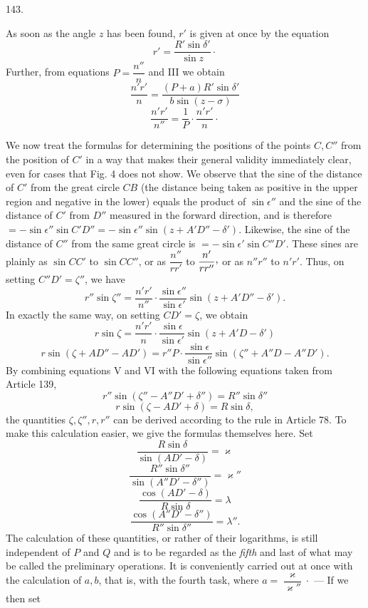 \par{}\medskip
\begin{center}\hypertarget{native-192-article143}{}143.\end{center}
As soon as the angle $z$ has been found, $r'$ is given at once by the equation
\[
r'=\frac{R'\sin\delta'}{\sin z}\mathpunct{\cdot}
\]
Further, from equations $P=\dfrac{n''}{n}$ and III we obtain
\[
\frac{n'r'}{n}=\frac{(P+a)R'\sin\delta'}{b\sin(z-\sigma)}
\]
\[
\frac{n'r'}{n''}=\frac{1}{P}\cdot\frac{n'r'}{n}\mathpunct{\cdot}
\]

We now treat the formulas for determining the positions of the points $C,C''$ from the position of $C'$ in a way that makes their general validity immediately clear, even for cases that Fig. 4 does not show. We observe that the sine of the distance of $C'$ from the great circle $CB$ (the distance being taken as positive in the upper region and negative in the lower) equals the product of $\sin\epsilon''$ and the sine of the distance of $C'$ from $D''$ measured in the forward direction, and is therefore $=-\sin\epsilon''\sin C'D''=-\sin\epsilon''\sin(z+A'D''-\delta')$. Likewise, the sine of the distance of $C''$ from the same great circle is $=-\sin\epsilon'\sin C''D'$. These sines are plainly as $\sin CC'$ to $\sin CC''$, or as $\dfrac{n''}{rr'}$ to $\dfrac{n'}{rr''}\mathpunct{\raisebox{.45ex}{,}}$ or as $n''r''$ to $n'r'$. Thus, on setting $C''D'=\zeta''$, we have
\[
\tag*{V.}r''\sin\zeta''=\frac{n'r'}{n''}\cdot\frac{\sin\epsilon''}{\sin\epsilon'}\sin(z+A'D''-\delta').
\]
In exactly the same way, on setting $CD'=\zeta$, we obtain
\[
\tag*{VI.}r\sin\zeta=\frac{n'r'}{n}\cdot\frac{\sin\epsilon}{\sin\epsilon'}\sin(z+A'D-\delta')
\]
\[
\tag*{VII.}r\sin(\zeta+AD''-AD')=r''P\cdot\frac{\sin\epsilon}{\sin\epsilon''}\sin(\zeta''+A''D-A''D').
\]
By combining equations V and VI with the following equations taken from Article 139,
\[
\tag*{VIII.}r''\sin(\zeta''-A''D'+\delta'')=R''\sin\delta''
\]
\[
\tag*{IX.}r\sin(\zeta-AD'+\delta)=R\sin\delta,
\]
the quantities $\zeta,\zeta'',r,r''$ can be derived according to the rule in Article 78. To make this calculation easier, we give the formulas themselves here. Set
\[
\tag*{17)}\frac{R\sin\delta}{\sin(AD'-\delta)}=\varkappa
\]
\[
\tag*{18)}\frac{R''\sin\delta''}{\sin(A''D'-\delta'')}=\varkappa''
\]
\[
\tag*{19)}\frac{\cos(AD'-\delta)}{R\sin\delta}=\lambda
\]
\[
\tag*{20)}\frac{\cos(A''D'-\delta'')}{R''\sin\delta''}=\lambda''.
\]
The calculation of these quantities, or rather of their logarithms, is still independent of $P$ and $Q$ and is to be regarded as the \emph{fifth} and last of what may be called the preliminary operations. It is conveniently carried out at once with the calculation of $a,b$, that is, with the fourth task, where $a=\dfrac{\varkappa}{\varkappa''}\mathpunct{\cdot}$ — If we then set

